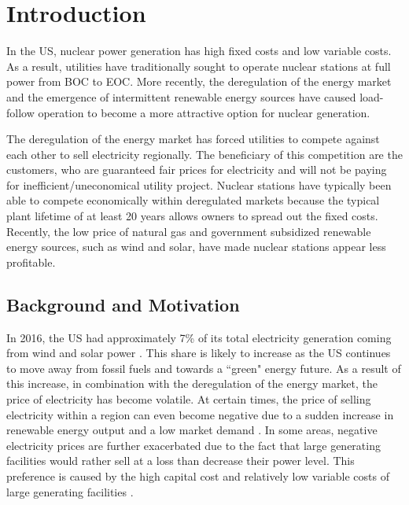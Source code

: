 \documentclass[edeposit,fullpage,11pt]{uiucthesis2009}
\begin{document}

\mainmatter
\glsresetall
\chapter{Introduction}

In the \gls{US}, nuclear power generation has high fixed costs and low variable costs. 
As a result, utilities have traditionally sought to operate nuclear stations at full power from \gls{BOC} to \gls{EOC}. 
More recently, the deregulation of the energy market and the emergence of intermittent renewable energy sources have caused load-follow operation to become a more attractive option for nuclear generation. 

The deregulation of the energy market has forced utilities to compete against each other to sell electricity regionally.
The beneficiary of this competition are the customers, who are guaranteed fair prices for electricity and will not be paying for inefficient/uneconomical utility project. %
Nuclear stations have typically been able to compete economically  within deregulated markets because the typical plant lifetime of at least 20 years allows owners to spread out the fixed costs.
Recently, the low price of natural gas and government subsidized renewable energy sources, such as wind and solar, have made nuclear stations appear less profitable.   

\section{Background and Motivation}

In 2016, the \gls{US} had approximately 7\% of its total electricity generation coming from wind and solar power \cite{u.s_energy_information_administration_electricity_2016}. 
This share is likely to increase as the \gls{US} continues to move away from fossil fuels and towards a ``green" energy future.
As a result of this increase, in combination with the deregulation of the energy market, the price of electricity has become volatile. 
At certain times, the price of selling electricity within a region can even become negative due to a sudden increase in renewable energy output and a low market demand \cite{paraschiv_impact_2014}. 
In some areas, negative electricity prices are further exacerbated due to the fact that large generating facilities would rather sell at a loss than decrease their power level. 
This preference is caused by the high capital cost and relatively low variable costs of large generating facilities \cite{lokhov_load-following_2011}.
\end{document}
